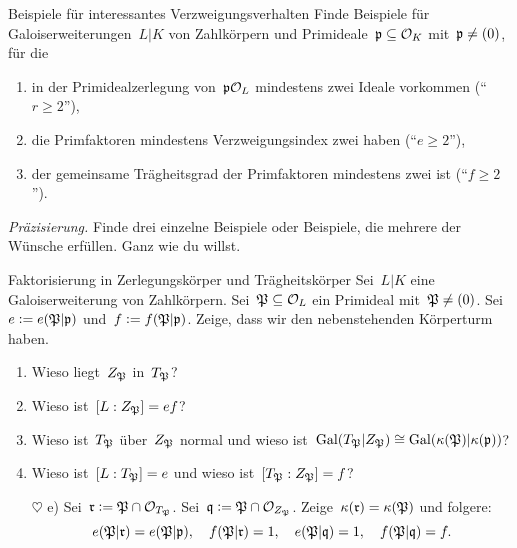 \documentclass{uebblatt}
\begin{document}

\begin{aufgabe}{Beispiele für interessantes Verzweigungsverhalten}
Finde Beispiele für Galoiserweiterungen~$L|K$ von Zahlkörpern und
Primideale~$\mathfrak{p} \subseteq \mathcal{O}_K$ mit~$\mathfrak{p} \neq (0)$, für die
\begin{enumerate}
\item in der Primidealzerlegung von~$\mathfrak{p}\mathcal{O}_L$ mindestens zwei Ideale vorkommen
("`$r \geq 2$"'),
\item die Primfaktoren mindestens Verzweigungsindex zwei haben ("`$e \geq 2$"'),
\item der gemeinsame Trägheitsgrad der Primfaktoren mindestens zwei ist ("`$f \geq 2$"').
\end{enumerate}
{\tiny\emph{Präzisierung.} Finde drei einzelne Beispiele oder Beispiele, die
mehrere der Wünsche erfüllen. Ganz wie du willst.\par}
\end{aufgabe}

\begin{aufgabe}{Faktorisierung in Zerlegungskörper und Trägheitskörper}
Sei~$L|K$ eine Galoiserweiterung von Zahlkörpern. Sei~$\mathfrak{P} \subseteq \mathcal{O}_L$ ein
Primideal mit~$\mathfrak{P} \neq (0)$. Sei~$e \vcentcolon= e(\mathfrak{P}|\mathfrak{p})$ und~$f \vcentcolon= f(\mathfrak{P}|\mathfrak{p})$.
Zeige, dass wir den nebenstehenden Körperturm haben.
\begin{enumerate}
\item Wieso liegt~$Z_{\mathfrak{P}}$ in~$T_{\mathfrak{P}}$?
\item Wieso ist~$[L : Z_{\mathfrak{P}}] = ef$?
\item Wieso ist~$T_{\mathfrak{P}}$ über~$Z_{\mathfrak{P}}$ normal und wieso ist~$\mathrm{Gal}(T_{\mathfrak{P}}|Z_{\mathfrak{P}}) \cong \mathrm{Gal}(\kappa(\mathfrak{P})|\kappa(\mathfrak{p}))$?
\item Wieso ist~$[L : T_{\mathfrak{P}}] = e$ und wieso ist~$[T_{\mathfrak{P}} : Z_{\mathfrak{P}}] = f$?
\item[$\heartsuit$ e)] Sei~$\mathfrak{r} \vcentcolon= \mathfrak{P} \cap \mathcal{O}_{T_{\mathfrak{P}}}$.
Sei~$\mathfrak{q} \vcentcolon= \mathfrak{P} \cap \mathcal{O}_{Z_{\mathfrak{P}}}$. Zeige~$\kappa(\mathfrak{r}) = \kappa(\mathfrak{P})$ und folgere:
\[ e(\mathfrak{P}|\mathfrak{r}) = e(\mathfrak{P}|\mathfrak{p}), \quad
  f(\mathfrak{P}|\mathfrak{r}) = 1, \quad
  e(\mathfrak{P}|\mathfrak{q}) = 1, \quad
  f(\mathfrak{P}|\mathfrak{q}) = f. \]
\end{enumerate}
\end{aufgabe}
\end{document}
